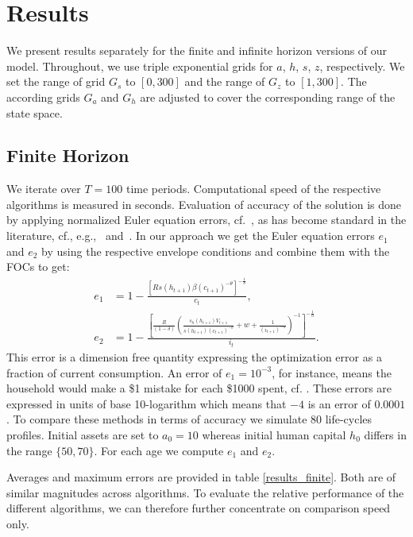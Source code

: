 \documentclass[a4paper,12pt]{article}%
\begin{document}
\section{Results}

We present results separately for the finite and infinite horizon versions of our model. Throughout, we use triple exponential grids for $a$, $h$, $s$, $z$, respectively. We set the range of grid $G_{s}$ to $\left[ 0,300\right]$ and the range of $G_{z}$ to $\left[ 1,300\right]$. The according grids $G_{a}$ and $G_{h}$ are adjusted to cover the corresponding range of the state space.

\subsection{Finite Horizon}

We iterate over $T=100$ time periods. Computational speed of the respective algorithms is measured in seconds. Evaluation of accuracy of the solution is done by applying normalized Euler equation errors, cf.~, as has become standard in the literature, cf., e.g.,~ and~. In our approach we get the Euler equation errors $e_{1}$ and $e_{2}$ by
using the respective envelope conditions and combine them with the FOCs to
get:
\begin{align*}
e_{1}  &  =1-\frac{\left[  Rs(h_{t+1})\beta\left(  c_{t+1}\right)  ^{-\theta}\right]  ^{-\frac{1}{\theta}}}{c_{t}},\\
e_{2}  &  =1-\frac{\left[  \frac{R}{\left(  1-\delta\right)  }\left(\frac{s_{h}(h_{t+1})V_{t+1}}{s(h_{t+1})\left(  c_{t+1}\right)  ^{-\theta}}+w+\frac{1}{\left(  i_{t+1}\right)  ^{-\alpha}}\right)  ^{-1}\right]^{-\frac{1}{\alpha}}}{i_{t}}.
\end{align*}
This error is a dimension free quantity expressing the optimization error as a fraction of current consumption. An error of $e_{1}=10^{-3}$, for instance, means the household would make a \$1 mistake for each \$1000 spent, cf. . These errors are expressed in units of base 10-logarithm which means that $-4$ is an error of $0.0001$. To compare these methods in terms of accuracy we simulate 80 life-cycles profiles. Initial assets are set to $a_{0}=10$ whereas initial human capital $h_{0}$ differs in the range $\{50,70\}$. For each age we compute $e_{1}$ and $e_{2}$.

Averages and maximum errors are provided in table \ref{results_finite}. Both are of similar magnitudes across algorithms. To evaluate the relative performance of the different algorithms, we can therefore further concentrate on comparison speed only.
\end{document}
